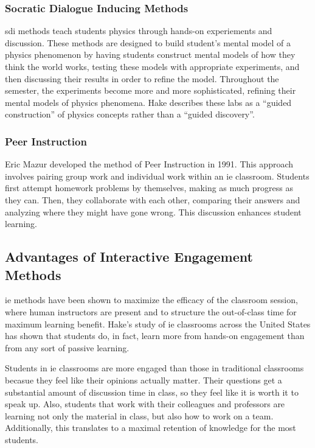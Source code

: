\subsubsection{Socratic Dialogue Inducing Methods}

\gls{sdi} methods teach students physics through hands-on experiements and discussion. These methods are designed to build student's mental model of a physics phenomenon by having students construct mental models of how they think the world works, testing these models with appropriate experiments, and then discussing their results in order to refine the model. Throughout the semester, the experiments become more and more sophisticated, refining their mental models of physics phenomena. Hake describes these labs as a ``guided construction'' of physics concepts rather than a ``guided discovery''\cite{hake1992}.

\subsubsection{Peer Instruction}

Eric Mazur developed the method of Peer Instruction in 1991. This approach involves pairing group work and individual work within an \gls{ie} classroom. Students first attempt homework problems by themselves, making as much progress as they can. Then, they collaborate with each other, comparing their answers and analyzing where they might have gone wrong. This discussion enhances student learning\cite{mazur1997}.

\subsection{Advantages of Interactive Engagement Methods}

\gls{ie} methods have been shown to maximize the efficacy of the classroom session, where human instructors are present and to structure the out-of-class time for maximum learning benefit. Hake's study of \gls{ie} classrooms across the United States has shown that students do, in fact, learn more from hands-on engagement than from any sort of passive learning\cite{hake1998}.

Students in \gls{ie} classrooms are more engaged than those in traditional classrooms becasue they feel like their opinions actually matter. Their questions get a substantial amount of discussion time in class, so they feel like it is worth it to speak up. Also, students that work with their colleagues and professors are learning not only the material in class, but also how to work on a team. Additionally, this translates to a maximal retention of knowledge for the most students\cite{novak1999}.

